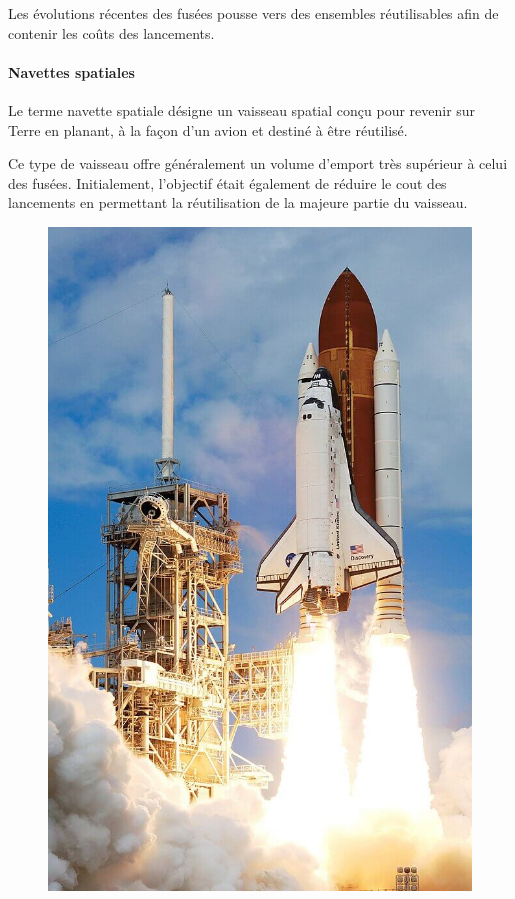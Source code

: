 		Les évolutions récentes des fusées pousse vers des ensembles réutilisables afin de contenir les coûts des lancements.	
		
		\paragraph{Navettes spatiales}
		Le terme navette spatiale  désigne un vaisseau spatial conçu pour revenir sur Terre en planant, à la façon d'un avion et destiné à être réutilisé.
		
		Ce type de vaisseau offre généralement un volume d'emport très supérieur à celui des fusées. Initialement, l'objectif était également de réduire le cout des lancements en permettant la réutilisation de la majeure partie du vaisseau.
		
		\begin{center}
		\begin{minipage}[c]{1.0\linewidth}
		\begin{figure}[H]
		\begin{minipage}[c]{0.3\linewidth}
		\centering
		\includegraphics[width=0.95\linewidth]{01-EtudeAeronefs/img/NavetteSpatialeNasa.jpg}

\end{minipage}
\end{figure}
\end{minipage}
\end{center}
